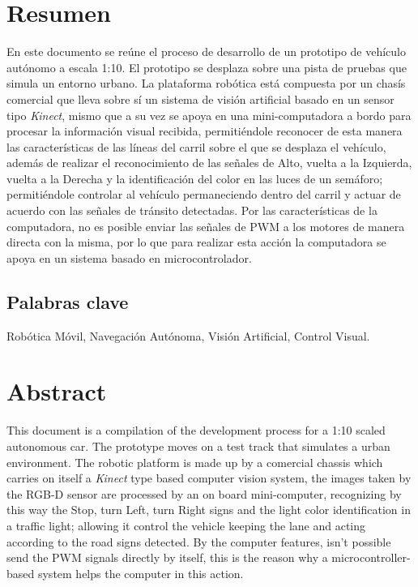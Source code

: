 \documentclass[12pt, letterpaper, oneside]{book}
\begin{document}
	\chapter*{Resumen}
	\label{cap:res}
	En este documento se reúne el proceso de desarrollo de un prototipo de vehículo autónomo a escala 1:10. El prototipo se desplaza sobre una pista de pruebas que simula un entorno urbano. La plataforma robótica está compuesta por un chasís comercial que lleva sobre sí un sistema de visión artificial basado en un sensor tipo {\it Kinect}, mismo que a su vez se apoya en una mini-computadora a bordo para procesar la información visual recibida, permitiéndole reconocer de esta manera las características de las líneas del carril sobre el que se desplaza el vehículo, además de realizar el reconocimiento de las señales de Alto, vuelta a la Izquierda, vuelta a la Derecha y la identificación del color en las luces de un semáforo; permitiéndole controlar al vehículo permaneciendo dentro del carril y actuar de acuerdo con las señales de tránsito detectadas. Por las características de la computadora, no es posible enviar las señales de PWM a los motores de manera directa con la misma, por lo que para realizar esta acción la computadora se apoya en un sistema basado en microcontrolador.
	\section*{Palabras clave}
	\label{sec:palcla}
	Robótica Móvil, Navegación Autónoma, Visión Artificial, Control Visual.
	\chapter*{Abstract}
	\label{cap:abs}
	This document is a compilation of the development process for a 1:10 scaled autonomous car. The prototype moves on a test track that simulates a urban environment. The robotic platform is made up by a comercial chassis which carries on itself a {\it Kinect} type based computer vision system, the images taken by the RGB-D sensor are processed by an on board mini-computer, recognizing by this way the Stop, turn Left, turn Right signs and the light color identification in a traffic light; allowing it control the vehicle keeping the lane and acting according to the road signs detected. By the computer features, isn't possible send the PWM signals directly by itself, this is the reason why a microcontroller-based system helps the computer in this action.
\end{document}
